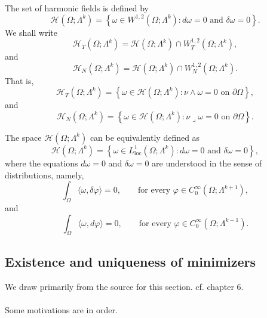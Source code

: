 \begin{definition}
The set of harmonic fields is defined by
    \[
        \mathcal{H}(\Omega;\Lambda^k)
        =
        \left\{
            \omega\in W^{1,2}(\Omega;\Lambda^k)
            : d\omega=0\text{ and }\delta\omega=0
        \right\}.
    \]
    We shall write
    \[
        \mathcal{H}_T(\Omega;\Lambda^k)
        =
        \mathcal{H}(\Omega;\Lambda^k)
        \cap
        W_T^{1,2}(\Omega;\Lambda^k),
    \]
    and
    \[
        \mathcal{H}_N(\Omega;\Lambda^k)
        =
        \mathcal{H}(\Omega;\Lambda^k)
        \cap
        W_N^{1,2}(\Omega;\Lambda^k).
    \]
    That is,
    \[
        \mathcal{H}_T(\Omega;\Lambda^k)
        =
        \left\{
            \omega\in\mathcal{H}(\Omega;\Lambda^k)
            : \nu\wedge\omega=0
            \text{ on }\partial\Omega
        \right\},
    \]
    and
    \[
        \mathcal{H}_N(\Omega;\Lambda^k)
        =
        \left\{
            \omega\in\mathcal{H}(\Omega;\Lambda^k)
            : \nu\lrcorner\omega=0
            \text{ on }\partial\Omega
        \right\}.\]

\end{definition}

\begin{remark}
The space $\mathcal{H}(\Omega;\Lambda^k)$ can be equivalently
    defined as
    \[
        \mathcal{H}(\Omega;\Lambda^k)
        =
        \left\{
            \omega\in L_{\mathrm{loc}}^1(\Omega;\Lambda^k)
            : d\omega=0\text{ and }\delta\omega=0
        \right\},
    \]
    where the equations $d\omega=0$ and $\delta\omega=0$ are understood
    in the sense of distributions, namely,
    \[
        \int_\Omega\langle\omega,\delta\varphi\rangle=0,
        \qquad
        \text{for every }
        \varphi\in C_0^\infty(\Omega;\Lambda^{k+1}),
    \]
    and
    \[
        \int_\Omega\langle\omega,d\varphi\rangle=0,
        \qquad
        \text{for every }
        \varphi\in C_0^\infty(\Omega;\Lambda^{k-1}).
    \]

\end{remark}
\subsection{Existence and uniqueness of minimizers}
We draw primarily from the source \cite{CsatoDacorognaKneuss2012} for this section. cf. chapter 6. 
\\\\Some motivations are in order. 


